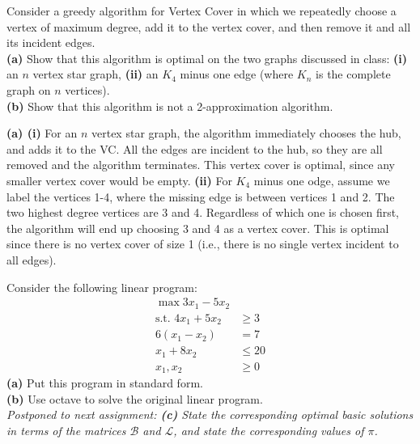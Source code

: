 \documentclass[fleqn]{homework}
\begin{document}
  \maketitle

  \begin{problem}{1}
    \begin{question}
      Consider a greedy algorithm for Vertex Cover in which we repeatedly choose
      a vertex of maximum degree, add it to the vertex cover, and then remove it
      and all its incident edges. \\
      \textbf{(a)} Show that this algorithm is optimal on the two graphs
      discussed in class: \textbf{(i)} an $n$ vertex star graph, \textbf{(ii)}
      an $K_4$ minus one edge (where $K_n$ is the complete graph on $n$ vertices).\\
      \textbf{(b)} Show that this algorithm is not a 2-approximation algorithm.
    \end{question}
    \textbf{(a) (i)} For an $n$ vertex star graph, the algorithm immediately
    chooses the hub, and adds it to the VC.  All the edges are incident to the
    hub, so they are all removed and the algorithm terminates.  This vertex
    cover is optimal, since any smaller vertex cover would be empty.
    \textbf{(ii)} For $K_4$ minus one odge, assume we label the vertices 1-4,
    where the missing edge is between vertices 1 and 2.  The two highest degree
    vertices are 3 and 4.  Regardless of which one is chosen first, the
    algorithm will end up choosing 3 and 4 as a vertex cover.  This is optimal
    since there is no vertex cover of size 1 (i.e., there is no single vertex
    incident to all edges).
  \end{problem}

  \begin{problem}{2}
    \begin{question}
      Consider the following linear program:
      \begin{align*}
        \max 3x_1 - 5x_2 & \\
        \text{s.t.  } 4x_1 + 5x_2 &\ge 3 \\
        6(x_1 - x_2) &= 7 \\
        x_1 + 8x_2 &\le 20 \\
        x_1, x_2 &\ge 0
      \end{align*}
      \textbf{(a)} Put this program in standard form.\\
      \textbf{(b)} Use octave to solve the original linear program.\\
      \textit{Postponed to next assignment: \textbf{(c)} State the corresponding
        optimal basic solutions in terms of the matrices $\mathcal{B}$ and
        $\mathcal{L}$, and state the corresponding values of $\pi$.}
    \end{question}
  \end{problem}
\end{document}
